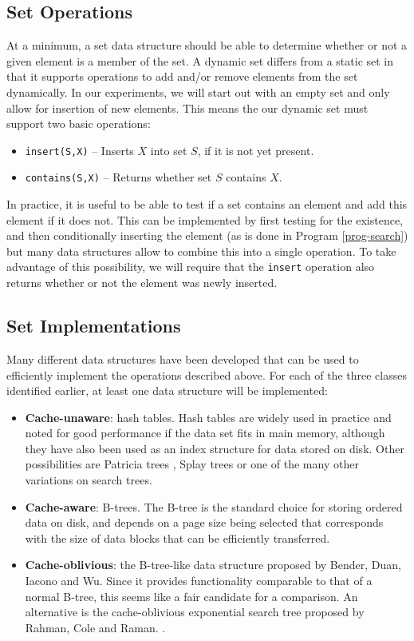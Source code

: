 \documentclass{acm_proc_article-sp}
\begin{document}
\subsection{Set Operations}
At a minimum, a set data structure should be able to determine whether or not a given element is a member of the set. A dynamic set differs from a static set in that it supports operations to add and/or remove elements from the set dynamically. In our experiments, we will start out with an empty set and only allow for insertion of new elements. This means the our dynamic set must support two basic operations:
\begin{itemize}
\item \verb#insert(S,X)# -- Inserts $X$ into set $S$, if it is not yet present.
\item \verb#contains(S,X)# -- Returns whether set $S$ contains $X$.
\end{itemize}
In practice, it is useful to be able to test if a set contains an element and add this element if it does not. This can be implemented by first testing for the existence, and then conditionally inserting the element (as is done in Program \ref{prog-search}) but many data structures allow to combine this into a single operation. To take advantage of this possibility, we will require that the \verb#insert# operation also returns whether or not the element was newly inserted.

\subsection{Set Implementations}
Many different data structures have been developed that can be used to efficiently implement the operations described above. For each of the three classes identified earlier, at least one data structure will be implemented:
\begin{itemize}
\item \textbf{Cache-unaware}: hash tables. Hash tables are widely used in practice and noted for good performance if the data set fits in main memory, although they have also been used as an index structure for data stored on disk. Other possibilities are Patricia trees \cite{morrison1968ppa}, Splay trees \cite{sleator1985sab} or one of the many other variations on search trees.
\item \textbf{Cache-aware}: B-trees. The B-tree is the standard choice for storing ordered data on disk, and depends on a page size being selected that corresponds with the size of data blocks that can be efficiently transferred.
\item \textbf{Cache-oblivious}: the B-tree-like data structure proposed by Bender, Duan, Iacono and Wu. Since it provides functionality comparable to that of a normal B-tree, this seems like a fair candidate for a comparison. An alternative is the cache-oblivious exponential search tree proposed by Rahman, Cole and Raman. \cite{rahman2001opd}.
\end{itemize}
\end{document}

